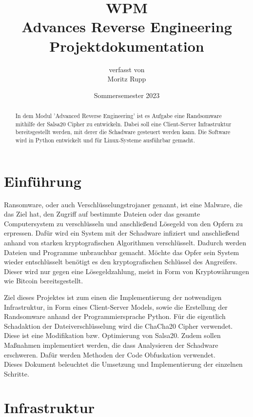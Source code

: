 \documentclass[12pt]{article}
\title{\small{WPM}\\\vspace{3mm}\Large{Advances Reverse Engineering\\\small{Projektdokumentation}}}
\author{ \small{verfasst von}\\ Moritz Rupp}
\date{Sommersemester 2023}
\begin{document}
\maketitle
\newpage
\tableofcontents
\newpage

\begin{abstract}
\noindent In dem Modul 'Advanced Reverse Engineering' ist es Aufgabe eine Randsomware mithilfe der Salsa20 Cipher zu entwickeln. Dabei soll eine Client-Server Infrastruktur bereitsgestellt werden, mit derer die Schadware gesteuert werden kann. Die Software wird in Python entwickelt und für Linux-Systeme ausführbar gemacht.
\end{abstract}
\section{Einführung}
Ransomware, oder auch Verschlüsselungstrojaner genannt, ist eine Malware, die das Ziel hat, den Zugriff auf bestimmte Dateien oder das gesamte Computersystem  zu verschlüsseln und anschließend Lösegeld von den Opfern zu erpressen. Dafür wird ein System mit der Schadware infiziert und anschließend anhand von starken kryptografischen Algorithmen verschlüsselt. Dadurch werden Dateien und Programme unbrauchbar gemacht. Möchte das Opfer sein System wieder entschlüsselt benötigt es den kryptografischen Schlüssel des Angreifers. Dieser wird nur gegen eine Lösegeldzahlung, meist in Form von Kryptowährungen wie Bitcoin bereitsgestellt. 
\newline


Ziel dieses Projektes ist zum einen die Implementierung der notwendigen Infrastruktur, in Form eines Client-Server Models, sowie die Erstellung der Randsomware anhand der Programmiersprache Python.
Für die eigentlich Schadaktion der Dateiverschlüsselung wird die ChaCha20 Cipher verwendet. Diese ist eine Modifikation bzw. Optimierung von Salsa20.
Zudem sollen Maßnahmen implementiert werden, die dass Analysieren der Schadware erschweren. Dafür werden Methoden der Code Obfuskation verwendet.\\
Dieses Dokument beleuchtet die Umsetzung und Implementierung der einzelnen Schritte.

\newpage
\section{Infrastruktur}
\end{document}
